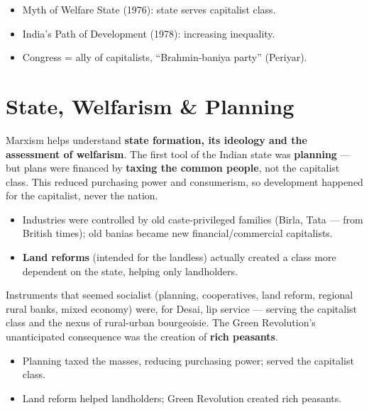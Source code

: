 \begin{QuickRevision}
\begin{itemize}
\item Myth of Welfare State (1976): state serves capitalist class.
\item India's Path of Development (1978): increasing inequality.
\item Congress = ally of capitalists, ``Brahmin-baniya party'' (Periyar).
\end{itemize}
\end{QuickRevision}

\section{State, Welfarism \& Planning}

Marxism helps understand \textbf{state formation, its ideology and the assessment of welfarism}. The first tool of the Indian state was \textbf{planning} --- but plans were financed by \textbf{taxing the common people}, not the capitalist class. This reduced purchasing power and consumerism, so development happened for the capitalist, never the nation.

\begin{itemize}
\item Industries were controlled by old caste-privileged families (Birla, Tata --- from British times); old banias became new financial/commercial capitalists.
\item \textbf{Land reforms} (intended for the landless) actually created a class more dependent on the state, helping only landholders.
\end{itemize}

\begin{CriticalPoint}
Instruments that seemed socialist (planning, cooperatives, land reform, regional rural banks, mixed economy) were, for Desai, lip service --- serving the capitalist class and the nexus of rural-urban bourgeoisie. The Green Revolution's unanticipated consequence was the creation of \textbf{rich peasants}.
\end{CriticalPoint}

\begin{QuickRevision}
\begin{itemize}
\item Planning taxed the masses, reducing purchasing power; served the capitalist class.
\item Land reform helped landholders; Green Revolution created rich peasants.
\end{itemize}
\end{QuickRevision}

